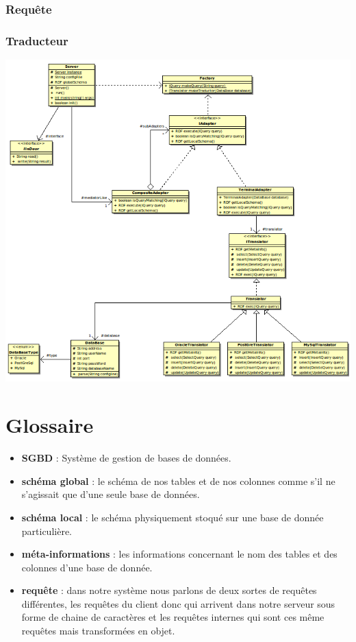 \documentclass[12pt]{article}
\begin{document}
\subsubsection{Requête}

\subsubsection{Traducteur}

\begin{center}
	\includegraphics[scale=0.75]{images/Serveur.png}
\end{center}

\newpage

\section{Glossaire}

	\begin{itemize}
		\item \textbf{SGBD} : Système de gestion de bases de données.\\
		\item \textbf{schéma global} : le schéma de nos tables et de nos colonnes comme s'il ne s'agissait que d'une seule base de données.\\
		\item \textbf{schéma local} : le schéma physiquement stoqué sur une base de donnée particulière.\\
		\item \textbf{méta-informations} : les informations concernant le nom des tables et des colonnes d'une base de donnée.\\
		\item \textbf{requête} : dans notre système nous parlons de deux sortes de requêtes différentes, les requêtes du client donc qui arrivent dans notre serveur sous forme de chaine de caractères et les requêtes internes qui sont ces même requêtes mais transformées en objet.\\
	\end{itemize}
\newpage
\end{document}
